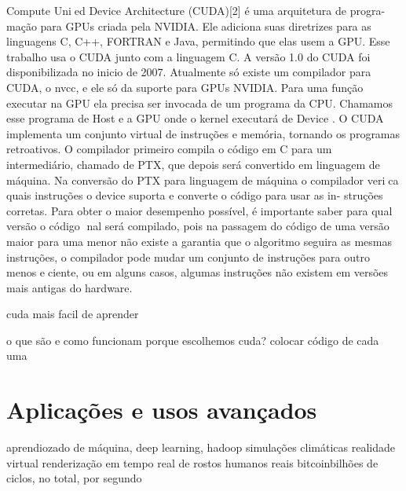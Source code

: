 Compute Unied Device Architecture (CUDA)[2] é uma arquitetura de progra-
mação para GPUs criada pela NVIDIA. Ele adiciona suas diretrizes para as
linguagens C, C++, FORTRAN e Java, permitindo que elas usem a GPU. Esse
trabalho usa o CUDA junto com a linguagem C. A versão 1.0 do CUDA foi
disponibilizada no inicio de 2007. Atualmente só existe um compilador para
CUDA, o nvcc, e ele só da suporte para GPUs NVIDIA.
Para uma função executar na GPU ela precisa ser invocada de um programa
da CPU. Chamamos esse programa de Host e a GPU onde o kernel executará
de Device .
O CUDA implementa um conjunto virtual de instruções e memória, tornando
os programas retroativos. O compilador primeiro compila o código em C para
um intermediário, chamado de PTX, que depois será convertido em linguagem
de máquina. Na conversão do PTX para linguagem de máquina o compilador
verica quais instruções o device suporta e converte o código para usar as in-
struções corretas. Para obter o maior desempenho possível, é importante saber
para qual versão o código nal será compilado, pois na passagem do código de
uma versão maior para uma menor não existe a garantia que o algoritmo seguira
as mesmas instruções, o compilador pode mudar um conjunto de instruções para
outro menos eciente, ou em alguns casos, algumas instruções não existem em
versões mais antigas do hardware.


cuda mais facil de aprender


  o que são e como funcionam
  porque escolhemos cuda?
  colocar código de cada uma

\section{Aplicações e usos avançados}

aprendiozado de máquina, deep learning,
hadoop
simulações climáticas
realidade virtual
renderização em tempo real de rostos humanos reais
bitcoinbilhões de ciclos, no total, por segundo
